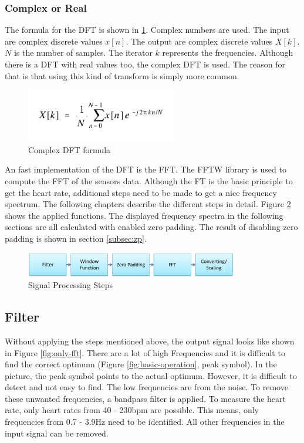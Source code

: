\documentclass[notitlepage]{scrreprt}
\begin{document}
\subsubsection{Complex or Real}
The formula for the DFT is shown in \ref{fig:dft-formula}. Complex numbers are used. The input are complex discrete values $x[n]$. The output are complex discrete values $X[k]$. $N$ is the number of samples. The iterator $k$ represents the frequencies. Although there is a DFT with real values too, the complex DFT is used. The reason for that is that using this kind of transform is simply more common.

\begin{figure}[H]
	\centering
	\includegraphics[width=250px]{images/complex_dft_formula.png}
	\caption{Complex DFT formula}
	\label{fig:dft-formula}
\end{figure}

An fast implementation of the DFT is the FFT. The FFTW library is used to compute the FFT of the sensors data. Although the FT is the basic principle to get the heart rate, additional steps need to be made to get a nice frequency spectrum. The following chapters describe the different steps in detail. Figure \ref{fig:signal-processing-steps1} shows the applied functions. The displayed frequency spectra in the following sections are all calculated with enabled zero padding. The result of disabling zero padding is shown in section \ref{subsec:zp}.

\begin{figure}[H]
	\centering
	\includegraphics[width=350px]{images/signal_processing_steps1.png}
	\caption{Signal Processing Steps}
	\label{fig:signal-processing-steps1}
\end{figure}

\subsection{Filter}
Without applying the steps mentioned above, the output signal looks like shown in Figure \ref{fig:only-fft}. There are a lot of high Frequencies and it is difficult to find the correct optimum (Figure \ref{fig:basic-operation}, peak symbol). In the picture, the peak symbol points to the actual optimum. However, it is difficult to detect and not easy to find. The low frequencies are from the noise. To remove these unwanted frequencies, a bandpass filter is applied. To measure the heart rate, only heart rates from 40 - 230bpm are possible. This means, only frequencies from 0.7 - 3.9Hz need to be identified. All other frequencies in the input signal can be removed.
\end{document}

